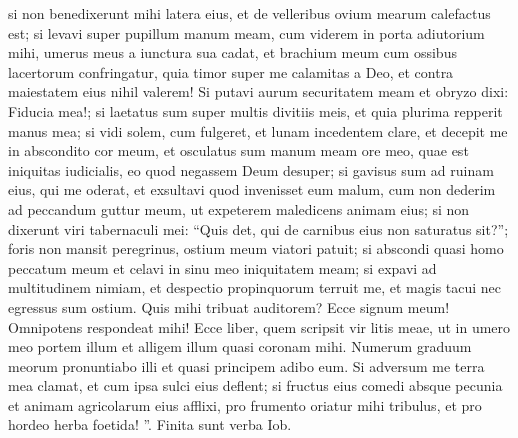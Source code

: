 \begin{biblechapter}
\begin{biblechapter}
\begin{biblechapter}
\begin{biblechapter}
\begin{biblechapter}
\begin{biblechapter}
\begin{biblechapter}
\begin{biblechapter}
\begin{biblechapter}
\begin{biblechapter}
\begin{biblechapter}
\begin{biblechapter}
\begin{biblechapter}
\begin{biblechapter}
\begin{biblechapter}
\begin{biblechapter}
\begin{biblechapter}
\begin{biblechapter}
\begin{biblechapter}
\begin{biblechapter}
\begin{biblechapter}
\begin{biblechapter}
\begin{biblechapter}
\begin{biblechapter}
\begin{biblechapter}
\begin{biblechapter}
\begin{biblechapter}
\begin{biblechapter}
\begin{biblechapter}
\begin{biblechapter}
\begin{biblechapter}
 \verse si non benedixerunt mihi latera eius,
 et de velleribus ovium mearum calefactus est;
 \verse si levavi super pupillum manum meam,
 cum viderem in porta adiutorium mihi,
 \verse umerus meus a iunctura sua cadat,
 et brachium meum cum ossibus lacertorum confringatur,
 \verse quia timor super me calamitas a Deo,
 et contra maiestatem eius nihil valerem!
 \verse Si putavi aurum securitatem meam
 et obryzo dixi: Fiducia mea!;
 \verse si laetatus sum super multis divitiis meis,
 et quia plurima repperit manus mea;
 \verse si vidi solem, cum fulgeret,
 et lunam incedentem clare,
 \verse et decepit me in abscondito cor meum,
 et osculatus sum manum meam ore meo,
 \verse quae est iniquitas iudicialis,
 eo quod negassem Deum desuper;
 \verse si gavisus sum ad ruinam eius, qui me oderat,
 et exsultavi quod invenisset eum malum,
 \verse cum non dederim ad peccandum guttur meum,
 ut expeterem maledicens animam eius;
 \verse si non dixerunt viri tabernaculi mei: “Quis det, qui de carnibus eius non saturatus sit?”;
 \verse foris non mansit peregrinus,
 ostium meum viatori patuit;
 \verse si abscondi quasi homo peccatum meum
 et celavi in sinu meo iniquitatem meam;
 \verse si expavi ad multitudinem nimiam,
 et despectio propinquorum terruit me,
 et magis tacui nec egressus sum ostium.
 \verse Quis mihi tribuat auditorem?
 Ecce signum meum! Omnipotens respondeat mihi!
 Ecce liber, quem scripsit vir litis meae,
 \verse ut in umero meo portem illum
 et alligem illum quasi coronam mihi.
 \verse Numerum graduum meorum pronuntiabo illi
 et quasi principem adibo eum.
 \verse Si adversum me terra mea clamat,
 et cum ipsa sulci eius deflent;
 \verse si fructus eius comedi absque pecunia
 et animam agricolarum eius afflixi,
 \verse pro frumento oriatur mihi tribulus,
 et pro hordeo herba foetida! ”.
 Finita sunt verba Iob.
 

\end{biblechapter}
\end{biblechapter}
\end{biblechapter}
\end{biblechapter}
\end{biblechapter}
\end{biblechapter}
\end{biblechapter}
\end{biblechapter}
\end{biblechapter}
\end{biblechapter}
\end{biblechapter}
\end{biblechapter}
\end{biblechapter}
\end{biblechapter}
\end{biblechapter}
\end{biblechapter}
\end{biblechapter}
\end{biblechapter}
\end{biblechapter}
\end{biblechapter}
\end{biblechapter}
\end{biblechapter}
\end{biblechapter}
\end{biblechapter}
\end{biblechapter}
\end{biblechapter}
\end{biblechapter}
\end{biblechapter}
\end{biblechapter}
\end{biblechapter}
\end{biblechapter}
